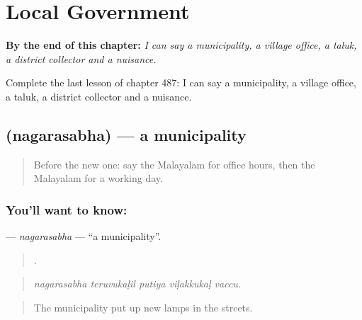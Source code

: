 
\chapter{Local Government}
\label{ch:ml-local-government}

\begin{chapteropening}
\textbf{By the end of this chapter:} \emph{I can say a municipality, a village office, a taluk, a district collector and a nuisance.}

Complete the last lesson of chapter 487: I can say a municipality, a village office, a taluk, a district collector and a nuisance.
\end{chapteropening}

\section[\texorpdfstring{\ml{നഗരസഭ} (nagarasabha)}{നഗരസഭ (nagarasabha)}]{ (nagarasabha) — a municipality}

\label{lesson:ML-C487-nagarasabha}



\begin{quote}
Before the new one: say the Malayalam for office hours, then the Malayalam for a working day.
\end{quote}

\subsection*{You'll want to know: }
\textbf{} — \emph{nagarasabha} — \textquotedblleft{}a municipality\textquotedblright{}.

\begin{quote}
    .
\end{quote}

\begin{quote}
\emph{nagarasabha teruvukaḷil putiya viḷakkukaḷ vaccu.}
\end{quote}

\begin{quote}
The municipality put up new lamps in the streets.
\end{quote}

